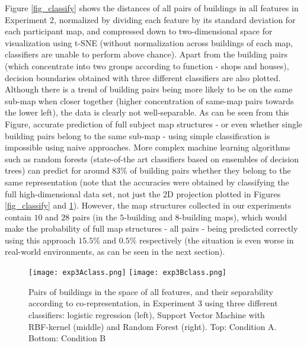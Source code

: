 Figure \ref{fig_classify} shows the distances of all pairs of buildings in all features in Experiment 2, normalized by dividing each feature by its standard deviation for each participant map, and compressed down to two-dimensional space for visualization using t-SNE \citep{van2008visualizing} (without normalization across buildings of each map, classifiers are unable to perform above chance). Apart from the building pairs (which concentrate into two groups according to function - shops and houses), decision boundaries obtained with three different classifiers are also plotted. Although there is a trend of building pairs being more likely to be on the same sub-map when closer together (higher concentration of same-map pairs towards the lower left), the data is clearly not well-separable. As can be seen from this Figure, accurate prediction of full subject map structures - or even whether single building pairs belong to the same sub-map - using simple classification is impossible using naive approaches. More complex machine learning algorithms such as random forests (state-of-the art classifiers based on ensembles of decision trees) \citep{breiman2001random} can predict for around $83 \%$ of building pairs whether they belong to the same representation (note that the accuracies were obtained by classifying the full high-dimensional data set, not just the 2D projection plotted in Figures \ref{fig_classify} and \ref{fig_classify_rl}). However, the map structures collected in our experiments contain $10$ and $28$ pairs (in the $5$-building and $8$-building maps), which would make the probability of full map structures - all pairs - being predicted correctly using this approach $15.5 \%$ and $0.5 \%$ respectively (the situation is even worse in real-world environments, as can be seen in the next section).

\begin{figure}[h]
	\centering
	\texttt{[image: exp3Aclass.png]}
	\texttt{[image: exp3Bclass.png]}
	\caption[Pairs of buildings in the space of all features, and separability, in Experiment 3]{Pairs of buildings in the space of all features, and their separability according to co-representation, in Experiment 3 using three different classifiers: logistic regression (left), Support Vector Machine with RBF-kernel (middle) and Random Forest (right). Top: Condition A. Bottom: Condition B}
	\label{fig_classify_rl}
\end{figure}

